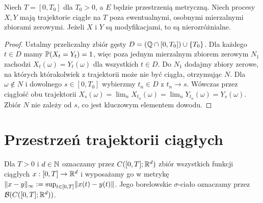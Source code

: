 \begin{twierdzenie}
Niech $T=[0,T_0]$ dla $T_0>0$, a $E$ będzie przestrzenią
metryczną. Niech procesy $X,Y$ mają trajektorie ciągłe na $T$
poza ewentualnymi, osobnymi mierzalnymi zbiorami zerowymi.
Jeżeli $X$ i $Y$ są modyfikacjami, to są nierozróżnialne.
\end{twierdzenie}
\begin{proof}
Ustalmy przeliczalny zbiór gęsty
$D=(\mathbb{Q}\cap[0,T_0])\cup\{T_0\}$.
Dla każdego $t\in D$ mamy $\mathbb{P}(X_t=Y_t)=1$,
więc poza jednym mierzalnym zbiorem zerowym $N_1$
zachodzi $X_t(\omega)=Y_t(\omega)$ dla wszystkich $t\in D$.
Do $N_1$ dodajmy zbiory zerowe, na których którakolwiek z
trajektorii może nie być ciągła, otrzymując $N$.
Dla $\omega\notin N$ i dowolnego $s\in[0,T_0]$
wybierzmy $t_n\in D$ z $t_n\to s$.
Wówczas przez ciągłość obu trajektorii
$X_s(\omega)=\lim_n X_{t_n}(\omega)
=\lim_n Y_{t_n}(\omega)=Y_s(\omega)$.
Zbiór $N$ nie zależy od $s$, co jest kluczowym elementem dowodu.
\end{proof}

\section{Przestrzeń trajektorii ciągłych}
\begin{definicja}[{Przestrzeń $C([0,T];\R^d)$}]
Dla $T>0$ i $d\in\mathbb{N}$ oznaczamy przez
$C([0,T];\R^d)$ zbiór wszystkich funkcji ciągłych
$x:[0,T]\to\mathbb{R}^d$ i wyposażamy go w metrykę
$\lVert x-y\rVert_\infty:=\sup_{t\in[0,T]}\lVert x(t)-y(t)\rVert$.
Jego borelowskie $\sigma$-ciało oznaczamy przez
$\mathcal{B}(C([0,T];\mathbb{R}^d))$.
\end{definicja}

